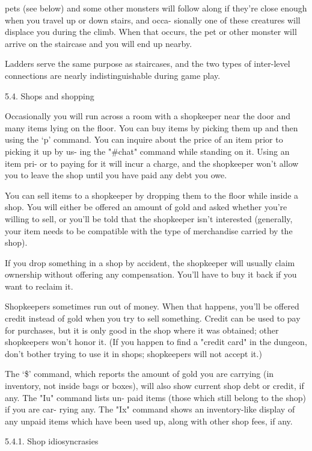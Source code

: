 \documentclass[11pt]{article}
\begin{document}
pets (see below) and some other monsters will follow along if
they're close enough when you travel up or down stairs, and occa-
sionally one of these creatures will displace you during the
climb. When that occurs, the pet or other monster will arrive on
the staircase and you will end up nearby.

   Ladders serve the same purpose as staircases, and the two
types of inter-level connections are nearly indistinguishable
during game play.

5.4. Shops and shopping

   Occasionally you will run across a room with a shopkeeper
near the door and many items lying on the floor.  You can buy
items by picking them up and then using the `p' command. You can
inquire about the price of an item prior to picking it up by us-
ing the "\#chat" command while standing on it. Using an item pri-
or to paying for it will incur a charge, and the shopkeeper won't
allow you to leave the shop until you have paid any debt you owe.

   You can sell items to a shopkeeper by dropping them to the
floor while inside a shop. You will either be offered an amount
of gold and asked whether you're willing to sell, or you'll be
told that the shopkeeper isn't interested (generally, your item
needs to be compatible with the type of merchandise carried by
the shop).

   If you drop something in a shop by accident, the shopkeeper
will usually claim ownership without offering any compensation.
You'll have to buy it back if you want to reclaim it.

   Shopkeepers sometimes run out of money. When that happens,
you'll be offered credit instead of gold when you try to sell
something. Credit can be used to pay for purchases, but it is
only good in the shop where it was obtained; other shopkeepers
won't honor it. (If you happen to find a "credit card" in the
dungeon, don't bother trying to use it in shops; shopkeepers will
not accept it.)

   The `\$' command, which reports the amount of gold you are
carrying (in inventory, not inside bags or boxes), will also show
current shop debt or credit, if any. The "Iu" command lists un-
paid items (those which still belong to the shop) if you are car-
rying any. The "Ix" command shows an inventory-like display of
any unpaid items which have been used up, along with other shop
fees, if any.

5.4.1. Shop idiosyncrasies
\end{document}
